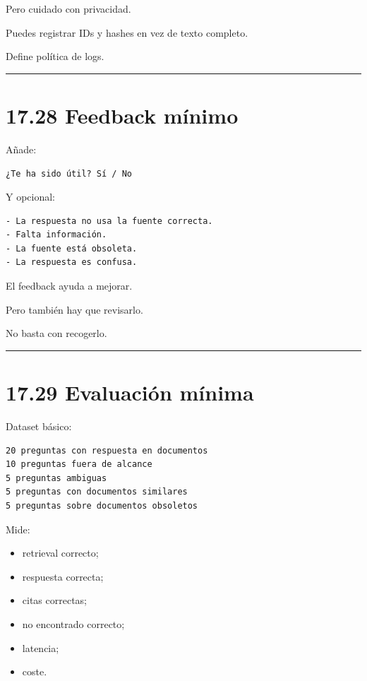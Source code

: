 Pero cuidado con privacidad.

Puedes registrar IDs y hashes en vez de texto completo.

Define política de logs.

\begin{center}\rule{0.5\linewidth}{0.5pt}\end{center}

\section{17.28 Feedback mínimo}\label{feedback-muxednimo}

Añade:

\begin{lstlisting}
¿Te ha sido útil? Sí / No
\end{lstlisting}

Y opcional:

\begin{lstlisting}
- La respuesta no usa la fuente correcta.
- Falta información.
- La fuente está obsoleta.
- La respuesta es confusa.
\end{lstlisting}

El feedback ayuda a mejorar.

Pero también hay que revisarlo.

No basta con recogerlo.

\begin{center}\rule{0.5\linewidth}{0.5pt}\end{center}

\section{17.29 Evaluación mínima}\label{evaluaciuxf3n-muxednima}

Dataset básico:

\begin{lstlisting}
20 preguntas con respuesta en documentos
10 preguntas fuera de alcance
5 preguntas ambiguas
5 preguntas con documentos similares
5 preguntas sobre documentos obsoletos
\end{lstlisting}

Mide:

\begin{itemize}
\tightlist
\item
  retrieval correcto;
\item
  respuesta correcta;
\item
  citas correctas;
\item
  no encontrado correcto;
\item
  latencia;
\item
  coste.
\end{itemize}

